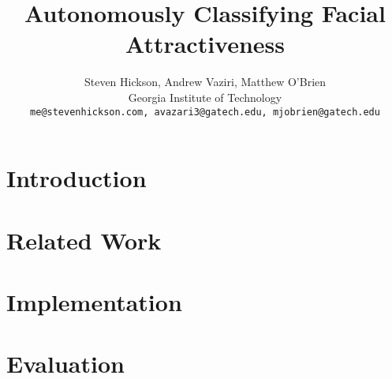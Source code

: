\documentclass[10pt,twocolumn,letterpaper]{article}
\begin{document}
\title{Autonomously Classifying Facial Attractiveness}

\author{Steven Hickson, Andrew Vaziri, Matthew O'Brien \\
Georgia Institute of Technology\\
{\tt\small me@stevenhickson.com, avazari3@gatech.edu, mjobrien@gatech.edu}
}

\maketitle


\section{Introduction}
 
\section{Related Work}

\section{Implementation}

\section{Evaluation}


{\small


}
\end{document}
